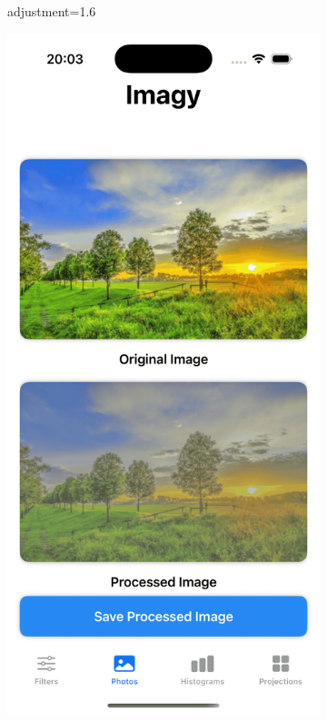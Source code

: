 \documentclass[a4paper]{article}
\begin{document}
\begin{figure}[H]
\begin{subfigure}{0.2\textwidth}
        \caption{adjustment=1.6}
        \label{fig:dog_contrast_1}
    \end{subfigure}
    \hfill
    \begin{subfigure}{0.2\textwidth}
        \centering
        \includegraphics[width=\linewidth]{images/trees_contrast_0.4.png}

\end{subfigure}
\end{figure}
\end{document}
